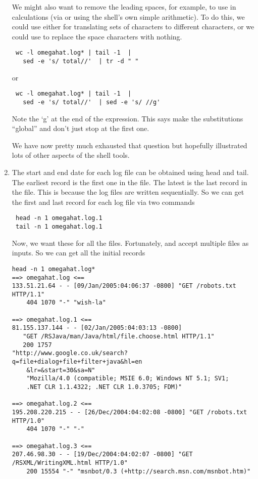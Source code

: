 \begin{enumerate}
We might also want to remove the leading spaces,
for example, to use in calculations (via 
or using the shell's own simple arithmetic).
To do this, we could use either
 for translating sets of characters to different
characters, or we could use  to replace the
space characters with nothing.
\begin{verbatim}
 wc -l omegahat.log* | tail -1  | 
   sed -e 's/ total//'  | tr -d " "
\end{verbatim}
or
\begin{verbatim}
 wc -l omegahat.log* | tail -1  | 
   sed -e 's/ total//'  | sed -e 's/ //g'
\end{verbatim}
Note the `g' at the end of the  expression.
This says make the substitutions ``global'' and don't just stop
at the first one.

We have now pretty much exhausted that question but hopefully 
illustrated lots of other aspects of the shell tools.


\item The start and end date for each log file can be obtained using
head and tail. 
The earliest record is the first one in the file.
The latest is the last record in the file.
This is because the log files are written sequentially.
So we can get the first and last record for each log file
via two commands
\begin{verbatim}
 head -n 1 omegahat.log.1
 tail -n 1 omegahat.log.1
\end{verbatim}
Now, we want these for all the files.
Fortunately,  and 
accept multiple files as inputs.
So we can get all the initial records
{\footnotesize{
\begin{verbatim}
head -n 1 omegahat.log*
==> omegahat.log <==
133.51.21.64 - - [09/Jan/2005:04:06:37 -0800] "GET /robots.txt HTTP/1.1" 
    404 1070 "-" "wish-la"

==> omegahat.log.1 <==
81.155.137.144 - - [02/Jan/2005:04:03:13 -0800] 
   "GET /RSJava/man/Java/html/file.choose.html HTTP/1.1" 
   200 1757 
"http://www.google.co.uk/search?q=file+dialog+file+filter+java&hl=en
    &lr=&start=30&sa=N" 
    "Mozilla/4.0 (compatible; MSIE 6.0; Windows NT 5.1; SV1; 
    .NET CLR 1.1.4322; .NET CLR 1.0.3705; FDM)"

==> omegahat.log.2 <==
195.208.220.215 - - [26/Dec/2004:04:02:08 -0800] "GET /robots.txt HTTP/1.0" 
    404 1070 "-" "-"

==> omegahat.log.3 <==
207.46.98.30 - - [19/Dec/2004:04:02:07 -0800] "GET /RSXML/WritingXML.html HTTP/1.0"
    200 15554 "-" "msnbot/0.3 (+http://search.msn.com/msnbot.htm)"


\end{verbatim}}}
\end{enumerate}
